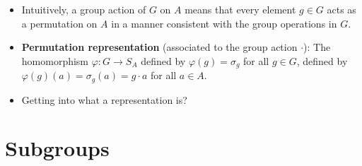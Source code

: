 \documentclass[../notes.tex]{subfiles}
\begin{document}
\begin{itemize}
\begin{enumerate}
\begin{proof}
\begin{align*}
                &= g_1\cdot(g_2\cdot a)\\
                &= g_1\cdot\sigma_{g_2}(a)\\
                &= \sigma_{g_1}(\sigma_{g_2}(a))\\
                &= (\sigma_{g_1}\circ\sigma_{g_2})(a)\\
                &= (\varphi(g_1)\circ\varphi(g_2))(a)
            \end{align*}
        \end{proof}
    \end{enumerate}
    \item Intuitively, a group action of $G$ on $A$ means that every element $g\in G$ acts as a permutation on $A$ in a manner consistent with the group operations in $G$.
    \item \textbf{Permutation representation} (associated to the group action $\cdot$): The homomorphism $\varphi:G\to S_A$ defined by $\varphi(g)=\sigma_g$ for all $g\in G$, defined by $\varphi(g)(a)=\sigma_g(a)=g\cdot a$ for all $a\in A$.
    \item Getting into what a representation is?
\end{itemize}



\chapter{Subgroups}
\end{document}
